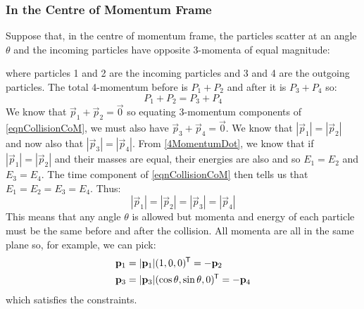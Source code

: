 \documentclass[../main.tex]{subfiles}
\begin{document}
\subsubsection{In the Centre of Momentum Frame}
Suppose that, in the centre of momentum frame, the particles scatter at an angle $\theta$ and the incoming particles have opposite 3-momenta of equal magnitude:
\begin{center}
\end{center}
where particles 1 and 2 are the incoming particles and 3 and 4 are the outgoing particles.
The total 4-momentum before is $P_1 + P_2$ and after it is $P_3 + P_4$ so:
\begin{equation}
  P_1 + P_2 = P_3 + P_4 \tag{$\dag$} \label{eqnCollisionCoM}
\end{equation}
We know that $\vec{p}_1 + \vec{p}_2 = \vec{0}$ so equating 3-momentum components of \cref{eqnCollisionCoM}, we must also have $\vec{p}_3 + \vec{p}_4 = \vec{0}$.
We know that $|\vec{p}_1| = |\vec{p}_2|$ and now also that $|\vec{p}_3| = |\vec{p}_4|$.
From \cref{4MomentumDot}, we know that if $|\vec{p}_1| = |\vec{p}_2|$ and their masses are equal, their energies are also and so $E_1 = E_2$ and $E_3 = E_4$.
The time component of \cref{eqnCollisionCoM} then tells us that $E_1 = E_2 = E_3 = E_4$.
Thus:
\[
  |\vec{p}_1| = |\vec{p}_2| = |\vec{p}_3| = |\vec{p}_4|
\]
This means that any angle $\theta$ is allowed but momenta and energy of each particle must be the same before and after the collision.
All momenta are all in the same plane so, for example, we can pick:
\begin{align*}
  \mathbf{\bm{p}}_1 &= |\mathbf{\bm{p}}_1|(1, 0, 0)^{{\mkern-1.5mu\mathsf{T}}} = - \mathbf{\bm{p}}_2 \\
  \mathbf{\bm{p}}_3 &= |\mathbf{\bm{p}}_3|(\cos\theta, \sin\theta, 0)^{{\mkern-1.5mu\mathsf{T}}} = - \mathbf{\bm{p}}_4
\end{align*}
which satisfies the constraints.
\end{document}
